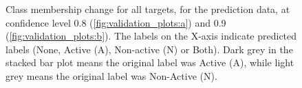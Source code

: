 \documentclass[utf8]{frontiersSCNS} %
\newcommand{\inlinetodo}[1]{{\color{magenta}\oldtodo[inline]{\color{white}\textsf{#1}}}}
\begin{document}
\begin{figure}[h!]
\begin{minipage}{0.45\textwidth}
    \label{fig:validation_plots:b}
\end{minipage}
    \caption{Class membership change for all targets, for the prediction data, at confidence level 0.8 (\ref{fig:validation_plots:a}) and 0.9 (\ref{fig:validation_plots:b}).
    The labels on the X-axis indicate predicted labels (None, Active (A),
    Non-active (N) or Both). Dark grey in the stacked bar plot means the
    original label was Active (A), while light grey means the original label
    was Non-Active (N).
    }
    \label{fig:validation_plots}
\end{figure}
\end{document}
